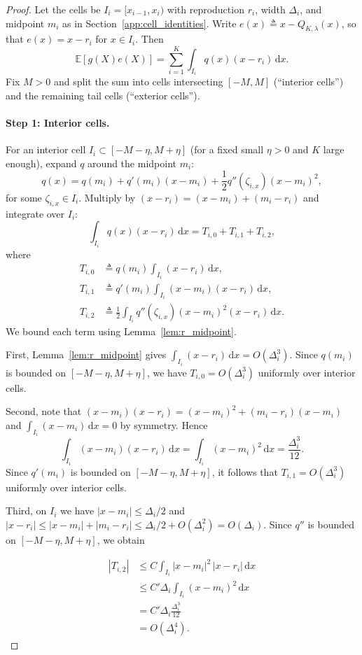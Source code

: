 \documentclass{article}
\newcommand{\E}{\mathbb{E}}
\newcommand{\abs}[1]{\left\lvert #1 \right\rvert}
\newcommand{\dd}{\,\mathrm{d}}
\newcommand{\defeq}{\triangleq}
\begin{document}
\begin{proof}
Let the cells be $I_i=[x_{i-1},x_i)$ with reproduction $r_i$, width $\Delta_i$, and midpoint $m_i$ as in Section~\ref{app:cell_identities}. Write $e(x)\defeq x-Q_{K,\lambda}(x)$, so that $e(x)=x-r_i$ for $x\in I_i$.
Then
\[
\E[g(X)e(X)] = \sum_{i=1}^K \int_{I_i} q(x)(x-r_i)\dd x.
\]
Fix $M>0$ and split the sum into cells intersecting $[-M,M]$ (``interior cells'') and the remaining tail cells (``exterior cells'').

\paragraph*{Step 1: Interior cells.}
For an interior cell $I_i\subset[-M-\eta,M+\eta]$ (for a fixed small $\eta>0$ and $K$ large enough), expand $q$ around the midpoint $m_i$:
\[
q(x)=q(m_i)+q'(m_i)(x-m_i)+\frac{1}{2}q''(\zeta_{i,x})(x-m_i)^2,
\]
for some $\zeta_{i,x}\in I_i$. Multiply by $(x-r_i)=(x-m_i)+(m_i-r_i)$ and integrate over $I_i$:
\[
\int_{I_i} q(x)(x-r_i)\dd x = T_{i,0}+T_{i,1}+T_{i,2},
\]
where
\begin{align*}
T_{i,0}&\defeq q(m_i)\int_{I_i}(x-r_i)\dd x,\\
T_{i,1}&\defeq q'(m_i)\int_{I_i}(x-m_i)(x-r_i)\dd x,\\
T_{i,2}&\defeq \frac{1}{2}\int_{I_i}q''(\zeta_{i,x})(x-m_i)^2(x-r_i)\dd x.
\end{align*}
We bound each term using Lemma~\ref{lem:r_midpoint}.

First, Lemma~\ref{lem:r_midpoint} gives $\int_{I_i}(x-r_i)\dd x=O(\Delta_i^3)$. Since $q(m_i)$ is bounded on $[-M-\eta,M+\eta]$, we have $T_{i,0}=O(\Delta_i^3)$ uniformly over interior cells.

Second, note that $(x-m_i)(x-r_i)=(x-m_i)^2+(m_i-r_i)(x-m_i)$ and $\int_{I_i}(x-m_i)\dd x=0$ by symmetry. Hence
\[
\int_{I_i}(x-m_i)(x-r_i)\dd x=\int_{I_i}(x-m_i)^2\dd x=\frac{\Delta_i^3}{12}.
\]
Since $q'(m_i)$ is bounded on $[-M-\eta,M+\eta]$, it follows that $T_{i,1}=O(\Delta_i^3)$ uniformly over interior cells.

Third, on $I_i$ we have $\abs{x-m_i}\le \Delta_i/2$ and $\abs{x-r_i}\le \abs{x-m_i}+\abs{m_i-r_i}\le \Delta_i/2 + O(\Delta_i^2)=O(\Delta_i)$. Since $q''$ is bounded on $[-M-\eta,M+\eta]$, we obtain

\begin{align*}
\abs{T_{i,2}}
&\le C \int_{I_i} \abs{x-m_i}^2\,\abs{x-r_i}\dd x\\
&\le C' \Delta_i \int_{I_i} (x-m_i)^2 \dd x\\
&= C' \Delta_i\frac{\Delta_i^3}{12}\\
&=O(\Delta_i^4).
\end{align*}


\end{proof}
\end{document}
